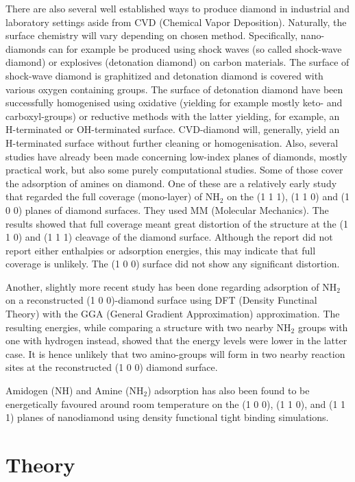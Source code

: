 \documentclass[10pt,a4paper]{article}
\begin{document}
There are also several well established ways to produce diamond in industrial and laboratory settings aside from CVD (Chemical Vapor Deposition). Naturally, the surface chemistry will vary depending on chosen method. Specifically, nano-diamonds can for example be produced using shock waves (so called shock-wave diamond) or explosives (detonation diamond) on carbon materials. The surface of shock-wave diamond is graphitized and detonation diamond is covered with various oxygen containing groups. The surface of detonation diamond have been successfully homogenised using oxidative (yielding for example mostly keto- and carboxyl-groups) or reductive methods with the latter yielding, for example, an H-terminated or OH-terminated surface. CVD-diamond will, generally, yield an H-terminated surface without further cleaning or homogenisation.\cite{ankekrueger2007} Also, several studies have already been made concerning low-index planes of diamonds, mostly practical work, but also some purely computational studies. Some of those cover the adsorption of amines on diamond.  One of these are a relatively early study that regarded the full coverage (mono-layer) of NH$_2$ on the (1 1 1), (1 1 0) and (1 0 0) planes of diamond surfaces. They used MM (Molecular Mechanics). The results showed that full coverage meant great distortion of the structure at the (1 1 0) and (1 1 1) cleavage of the diamond surface. Although the report did not report either enthalpies or adsorption energies, this may indicate that full coverage is unlikely. The (1 0 0) surface did not show any significant distortion. \cite{johnb.miller2001}

Another, slightly more recent study has been done regarding adsorption of NH$_2$ on a reconstructed (1 0 0)-diamond surface using DFT (Density Functinal Theory) with the GGA (General Gradient Approximation) approximation. The resulting energies, while comparing a structure with two nearby NH$_2$ groups with one with hydrogen instead, showed that the energy levels were lower in the latter case. It is hence unlikely that two amino-groups will form in two nearby reaction sites at the reconstructed (1 0 0) diamond surface. \cite{yan.dong2010}

Amidogen (NH) and Amine (NH$_2$) adsorption has also been found to be energetically favoured around room temperature on the (1 0 0), (1 1 0), and (1 1 1) planes of nanodiamond using density functional tight binding simulations.  \cite{lin.lai2011}

\section{Theory}
\end{document}
